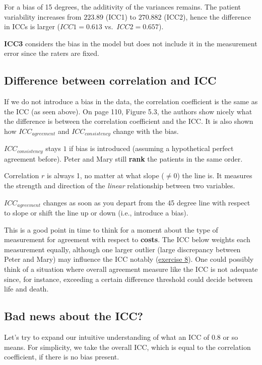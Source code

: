 \documentclass[
]{book}
\begin{document}
For a bias of 15 degrees, the additivity of the variances remains.
The patient variability increases from \(223.89\) (ICC1) to \(270.882\) (ICC2),
hence the difference in ICCs is larger (\(ICC1=0.613\) vs.~\(ICC2=0.657\)).

\textbf{ICC3} considers the bias in the model but does not include it in the measurement
error since the raters are fixed.

\subsection{Difference between correlation and ICC}\label{difference-between-correlation-and-icc}

If we do not introduce a bias in the data, the correlation coefficient
is the same as the ICC (as seen above). On page 110, Figure 5.3, the authors show nicely
what the difference is between the correlation coefficient and the ICC.
It is also shown how \(ICC_{agreement}\) and \(ICC_{consistency}\) change with the bias.

\(ICC_{consistency}\) stays \(1\) if bias is introduced (assuming a hypothetical
perfect agreement before). Peter and Mary still \textbf{rank} the patients
in the same order.

Correlation \(r\) is always 1, no matter at what slope (\(\ne 0\)) the line is.
It measures the strength and direction of the \emph{linear} relationship between two variables.

\(ICC_{agreement}\) changes as soon as you depart from the 45 degree line
with respect to slope or
shift the line up or down (i.e., introduce a bias).

This is a good point in time to think for a moment about the type of measurement
for agreement with respect to \textbf{costs}. The ICC below weights each measurement
equally, although one larger outlier (large discrepancy between Peter and Mary)
may influence the ICC notably (\hyperref[exercise8]{exercise 8}).
One could possibly think of a situation where
overall agreement measure like the ICC is not adequate since,
for instance, exceeding a certain
difference threshold could decide between life and death.

\subsection{Bad news about the ICC?}\label{badnews}

Let's try to expand our intuitive understanding of what an ICC of 0.8 or so means.
For simplicity, we take the overall ICC, which is equal to the correlation coefficient,
if there is no bias present.
\end{document}
